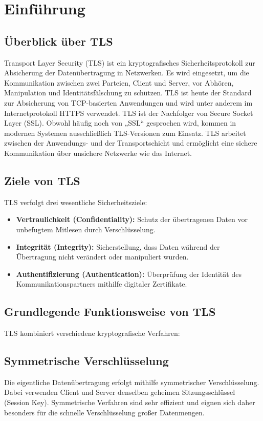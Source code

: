 \section{Einführung}
\subsection{Überblick über TLS}
Transport Layer Security (TLS) ist ein kryptografisches Sicherheitsprotokoll zur Absicherung der Datenübertragung in Netzwerken. Es wird eingesetzt, um die Kommunikation zwischen zwei Parteien, Client und Server, vor Abhören, Manipulation und Identitätsfälschung zu schützen. TLS ist heute der Standard zur Absicherung von TCP-basierten Anwendungen und wird unter anderem im Internetprotokoll HTTPS verwendet. TLS ist der Nachfolger von Secure Socket Layer (SSL). Obwohl häufig noch von „SSL“ gesprochen wird, kommen in modernen Systemen ausschließlich TLS-Versionen zum Einsatz. TLS arbeitet zwischen der Anwendungs- und der Transportschicht und ermöglicht eine sichere Kommunikation über unsichere Netzwerke wie das Internet.
\subsection{Ziele von TLS}
TLS verfolgt drei wesentliche Sicherheitsziele:
\begin{itemize}
  \item \textbf{Vertraulichkeit (Confidentiality):} Schutz der übertragenen Daten vor unbefugtem Mitlesen durch Verschlüsselung.
  \item \textbf{Integrität (Integrity):} Sicherstellung, dass Daten während der Übertragung nicht verändert oder manipuliert wurden.
  \item \textbf{Authentifizierung (Authentication):} Überprüfung der Identität des Kommunikationspartners mithilfe digitaler Zertifikate.
\end{itemize}

\subsection{Grundlegende Funktionsweise von TLS}
TLS kombiniert verschiedene kryptografische Verfahren:

\subsection*{Symmetrische Verschlüsselung}
Die eigentliche Datenübertragung erfolgt mithilfe symmetrischer Verschlüsselung. Dabei verwenden Client und Server denselben geheimen Sitzungsschlüssel (Session Key). Symmetrische Verfahren sind sehr effizient und eignen sich daher besonders für die schnelle Verschlüsselung großer Datenmengen.

